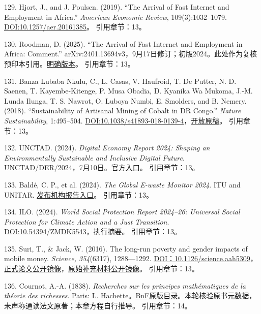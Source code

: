 \documentclass[UTF8,fontset=windows,12pt,a4paper,oneside,openany]{ctexbook}
\begin{document}
129. Hjort, J., and J. Poulsen. (2019). “The Arrival of Fast Internet and Employment in Africa.” \emph{American Economic Review}, 109(3):1032–1079. \href{https://doi.org/10.1257/aer.20161385}{DOI:10.1257/aer.20161385}。
引用章节：13。

130. Roodman, D. (2025). “The Arrival of Fast Internet and Employment in Africa: Comment.” arXiv:2401.13694v3，9月17日修订；初版2024。此处作为复核预印本引用。\href{https://arxiv.org/abs/2401.13694v3}{明确版本}。
引用章节：13。

131. Banza Lubaba Nkulu, C., L. Casas, V. Haufroid, T. De Putter, N. D. Saenen, T. Kayembe-Kitenge, P. Musa Obadia, D. Kyanika Wa Mukoma, J.-M. Lunda Ilunga, T. S. Nawrot, O. Luboya Numbi, E. Smolders, and B. Nemery. (2018). “Sustainability of Artisanal Mining of Cobalt in DR Congo.” \emph{Nature Sustainability}, 1:495–504. \href{https://doi.org/10.1038/s41893-018-0139-4}{DOI:10.1038/s41893-018-0139-4}，\href{https://pmc.ncbi.nlm.nih.gov/articles/PMC6166862/}{开放原稿}。
引用章节：13。

132. UNCTAD. (2024). \emph{Digital Economy Report 2024: Shaping an Environmentally Sustainable and Inclusive Digital Future}. UNCTAD/DER/2024，7月10日。\href{https://unctad.org/publication/digital-economy-report-2024}{官方入口}。
引用章节：13。

133. Baldé, C. P., et al. (2024). \emph{The Global E-waste Monitor 2024}. ITU and UNITAR. \href{https://ewastemonitor.info/the-global-e-waste-monitor-2024/}{发布机构报告入口}。
引用章节：13。

134. ILO. (2024). \emph{World Social Protection Report 2024–26: Universal Social Protection for Climate Action and a Just Transition}. \href{https://doi.org/10.54394/ZMDK5543}{DOI:10.54394/ZMDK5543}，\href{https://www.ilo.org/sites/default/files/2024-09/SOCPRO_WSPR_2024_Executive_Summary_EN_Web.pdf}{执行摘要}。
引用章节：13。

135. Suri, T., \& Jack, W. (2016). The long-run poverty and gender impacts of mobile money. \emph{Science, 354}(6317), 1288—1292. \href{https://doi.org/10.1126/science.aah5309}{DOI：10.1126/science.aah5309}，\href{https://www.jefftk.com/suri2016.pdf}{正式论文公开镜像}，\href{https://www.jefftk.com/suri2016-supp.pdf}{原始补充材料公开镜像}。
引用章节：13。

136. Cournot, A.-A. (1838). \emph{Recherches sur les principes mathématiques de la théorie des richesses}. Paris: L. Hachette。\href{https://catalogue.bnf.fr/ark:/12148/cb30280488q}{BnF原版目录}。本轮核验原书元数据，未声称通读法文原著；本章方程自行推导。
引用章节：14。
\end{document}
